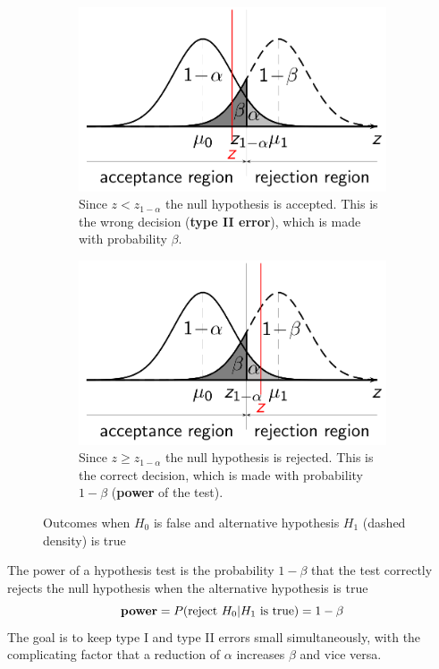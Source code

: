 \documentclass[11pt]{article}
\theoremstyle{definition}
\begin{document}
\begin{figure}[H]
	\begin{subfigure}{0.48\linewidth}
		\includegraphics[width=\linewidth]{img/type_II_false.png}
		\caption{Since $z < z_{1-\alpha}$ the null hypothesis is accepted. This is the wrong decision (\textbf{type II error}), which is made with probability $\beta$.}
	\end{subfigure}
	\hfill
	\begin{subfigure}{0.48\linewidth}
		\includegraphics[width=\linewidth]{img/type_II_correct.png}
		\caption{Since $z \geq z_{1-\alpha}$ the null hypothesis is rejected. This is the correct decision, which is made with probability $1 - \beta$ (\textbf{power} of the test).}
	\end{subfigure}
	\caption{Outcomes when $H_0$ is false and alternative hypothesis $H_1$ (dashed density) is true}
\end{figure}

The power of a hypothesis test is the probability $1-\beta$ that the test correctly rejects the null hypothesis when the alternative hypothesis is true
\begin{equation*}
	\text{\textbf{power}} = P(\text{reject $H_0$}|\text{$H_1$ is true}) = 1 - \beta
\end{equation*}
The goal is to keep type I and type II errors small simultaneously, with the complicating factor that a reduction of $\alpha$ increases $\beta$ and vice versa.
\end{document}
